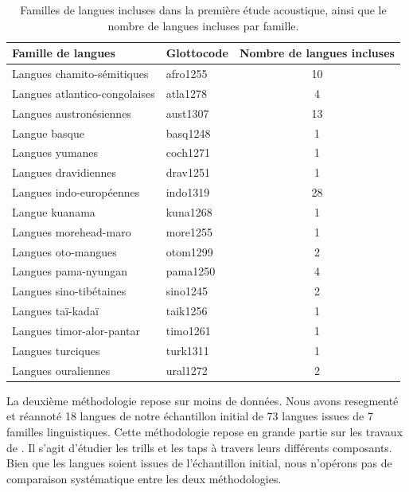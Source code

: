 \begin{table}

\begin{tabular}{llc}
	\hline
	Famille de langues & Glottocode & Nombre de langues incluses \\
	\hline
	Langues chamito-sémitiques & afro1255 & 10 \\

	Langues atlantico-congolaises & atla1278 & 4 \\

	Langues austronésiennes & aust1307 & 13 \\

	Langue basque & basq1248 & 1 \\

	Langues yumanes & coch1271	 & 1 \\

	Langues dravidiennes & drav1251 & 1 \\

	Langues indo-européennes & indo1319 & 28 \\

	Langue kuanama & kuna1268 & 1 \\
	
	Langues morehead-maro & more1255 & 1 \\

	Langues oto-mangues & otom1299	 & 2 \\

	Langues pama-nyungan  & pama1250 & 4 \\

	Langues sino-tibétaines & sino1245 & 2 \\

	Langues taï-kadaï & taik1256 & 1 \\

	Langues timor-alor-pantar & timo1261 & 1 \\

	Langues turciques & turk1311 & 1 \\

	Langues ouraliennes & ural1272 & 2 \\
	\hline
\end{tabular}
\caption[Familles de langues incluses dans la première étude acoustique]{Familles de langues incluses dans la première étude acoustique, ainsi que le nombre de langues incluses par famille.} \label{tab:fam73}
\end{table}

La deuxième méthodologie repose sur moins de données. Nous avons resegmenté et réannoté 18 langues de notre échantillon initial de 73 langues issues de 7 familles linguistiques. Cette méthodologie repose en grande partie sur les travaux de \citeauthor{blecuaVibrantesEspanolManifestaciones2002}. Il s'agit d'étudier les trills et les taps à travers leurs différents composants. Bien que les langues soient issues de l'échantillon initial, nous n'opérons pas de comparaison systématique entre les deux méthodologies.\\

